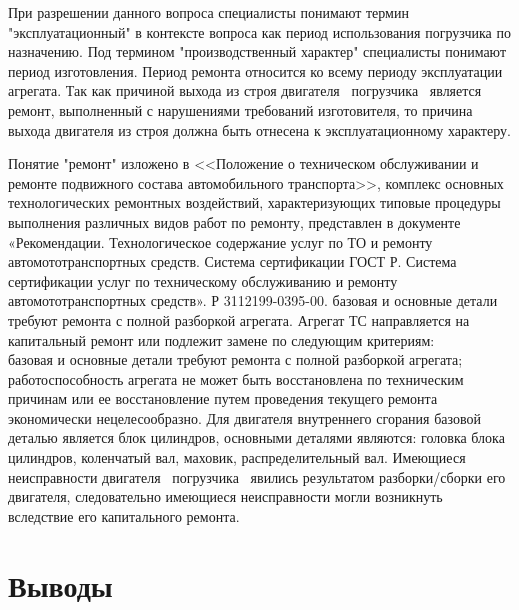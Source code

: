При разрешении данного вопроса специалисты понимают термин "эксплуатационный" в контексте вопроса   как период использования погрузчика по назначению. Под термином "производственный характер" специалисты понимают период изготовления.  Период ремонта относится ко всему периоду эксплуатации агрегата.  Так как причиной выхода из строя двигателя  \, погрузчика \, является ремонт, выполненный с нарушениями требований изготовителя, то причина выхода двигателя из строя должна быть отнесена к эксплуатационному характеру.  



Понятие "ремонт" изложено в <<Положение о техническом обслуживании и ремонте подвижного
состава автомобильного транспорта>>, комплекс основных технологических ремонтных воздействий, характеризующих типовые процедуры выполнения различных видов работ по ремонту, представлен в документе «Рекомендации. Технологическое содержание услуг по ТО и ремонту автомототранспортных средств. Система сертификации ГОСТ Р. Система сертификации услуг по техническому обслуживанию и ремонту автомототранспортных средств». Р 3112199-0395-00. базовая и основные детали требуют ремонта с полной разборкой агрегата. Агрегат ТС направляется на капитальный ремонт или подлежит замене по следующим критериям:\\
базовая и основные детали требуют ремонта с полной разборкой агрегата;
работоспособность агрегата не может быть восстановлена по техническим причинам или ее восстановление путем проведения текущего ремонта экономически нецелесообразно.
Для двигателя внутреннего сгорания базовой деталью является блок цилиндров, основными деталями являются: головка блока цилиндров, коленчатый вал, маховик, распределительный вал.
Имеющиеся неисправности двигателя  \, погрузчика \, явились результатом разборки/сборки его двигателя,  следовательно имеющиеся неисправности могли возникнуть вследствие его капитального ремонта. 


\vspace{2.5mm}
\section{Выводы}

